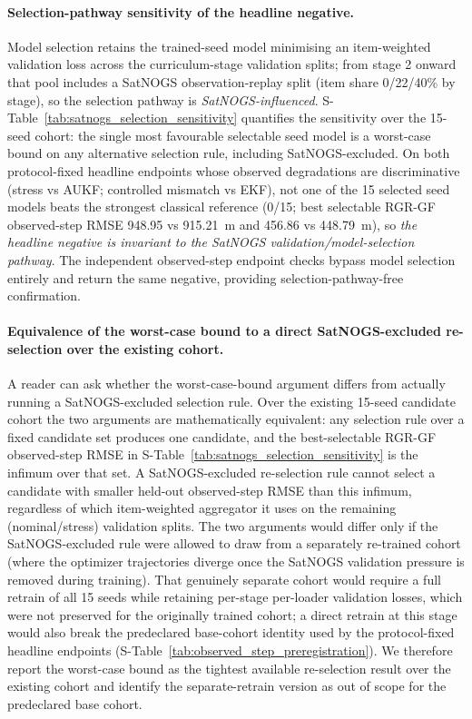 \documentclass{article}
\begin{document}
\paragraph{Selection-pathway sensitivity of the headline negative.}
Model selection retains the trained-seed model minimising an item-weighted validation loss across the curriculum-stage validation splits; from stage 2 onward that pool includes a SatNOGS observation-replay split (item share 0/22/40\% by stage), so the selection pathway is \emph{SatNOGS-influenced}. S-Table~\ref{tab:satnogs_selection_sensitivity} quantifies the sensitivity over the 15-seed cohort: the single most favourable selectable seed model is a worst-case bound on any alternative selection rule, including SatNOGS-excluded. On both protocol-fixed headline endpoints whose observed degradations are discriminative (stress vs AUKF; controlled mismatch vs EKF), not one of the 15 selected seed models beats the strongest classical reference (0/15; best selectable RGR-GF observed-step RMSE 948.95 vs 915.21~m and 456.86 vs 448.79~m), so \emph{the headline negative is invariant to the SatNOGS validation/model-selection pathway}. The independent observed-step endpoint checks bypass model selection entirely and return the same negative, providing selection-pathway-free confirmation.

\paragraph{Equivalence of the worst-case bound to a direct SatNOGS-excluded re-selection over the existing cohort.}
A reader can ask whether the worst-case-bound argument differs from actually running a SatNOGS-excluded selection rule. Over the existing 15-seed candidate cohort the two arguments are mathematically equivalent: any selection rule over a fixed candidate set produces one candidate, and the best-selectable RGR-GF observed-step RMSE in S-Table~\ref{tab:satnogs_selection_sensitivity} is the infimum over that set. A SatNOGS-excluded re-selection rule cannot select a candidate with smaller held-out observed-step RMSE than this infimum, regardless of which item-weighted aggregator it uses on the remaining (nominal/stress) validation splits. The two arguments would differ only if the SatNOGS-excluded rule were allowed to draw from a separately re-trained cohort (where the optimizer trajectories diverge once the SatNOGS validation pressure is removed during training). That genuinely separate cohort would require a full retrain of all 15 seeds while retaining per-stage per-loader validation losses, which were not preserved for the originally trained cohort; a direct retrain at this stage would also break the predeclared base-cohort identity used by the protocol-fixed headline endpoints (S-Table~\ref{tab:observed_step_preregistration}). We therefore report the worst-case bound as the tightest available re-selection result over the existing cohort and identify the separate-retrain version as out of scope for the predeclared base cohort.

\end{document}
